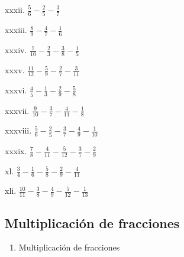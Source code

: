 \documentclass[]{book}
\providecommand{\tightlist}{%
  \setlength{\itemsep}{0pt}\setlength{\parskip}{0pt}}
\begin{document}
\begin{multicols}{2}
    xxxii. $\frac{5}{6} - \frac{2}{5} - \frac{3}{7}$
 
    xxxiii. $\frac{8}{9} - \frac{4}{7} - \frac{1}{6}$
 
    xxxiv. $\frac{7}{10} - \frac{2}{3} - \frac{3}{8} - \frac{1}{5}$
 
    xxxv. $\frac{11}{12} - \frac{5}{9} - \frac{2}{7} - \frac{3}{11}$
 
    xxxvi. $\frac{4}{5} - \frac{1}{3} - \frac{2}{9} - \frac{5}{8}$
 
    xxxvii. $\frac{9}{10} - \frac{3}{7} - \frac{4}{11} - \frac{1}{8}$
 
    xxxviii. $\frac{5}{6} - \frac{2}{5} - \frac{3}{7} - \frac{4}{9} - \frac{1}{10}$
 
    xxxix. $\frac{7}{8} - \frac{4}{11} - \frac{5}{12} - \frac{3}{7} - \frac{2}{9}$
 
    xl. $\frac{3}{4} - \frac{1}{6} - \frac{5}{8} - \frac{2}{9} - \frac{4}{11}$
 
    xli. $\frac{10}{11} - \frac{3}{8} - \frac{4}{9} - \frac{5}{12} - \frac{1}{13}$
\end{multicols}

\subsection{Multiplicación de
fracciones}\label{multiplicaciuxf3n-de-fracciones}

\begin{enumerate}
\def\labelenumi{\arabic{enumi}.}
\setcounter{enumi}{2}
\tightlist
\item
  Multiplicación de fracciones
\end{enumerate}
\end{document}
